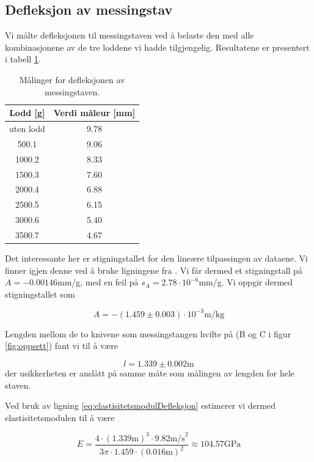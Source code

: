 \documentclass[a4paper,11pt, twocolumn]{article}
\begin{document}
\subsection{Defleksjon av messingstav}
Vi målte defleksjonen til messingstaven ved å belaste den med alle kombinasjonene av de tre loddene vi hadde tilgjengelig. Resultatene er presentert i tabell \ref{tab:defleksjon}.
\begin{table}[!ht]
\centering
\caption{Målinger for defleksjonen av messingstaven.}
\label{tab:defleksjon}
\begin{tabular}{cc}
	\toprule
	\toprule
	Lodd [g] & Verdi måleur [mm]\\
	\hline
	uten lodd & 9.78\\
	500.1 & 9.06\\
	1000.2 & 8.33\\
	1500.3 & 7.60\\
	2000.4 & 6.88\\
	2500.5 & 6.15\\
	3000.6 & 5.40\\
	3500.7 & 4.67\\
	\toprule
\end{tabular}
\end{table}

Det interessante her er stigningstallet for den lineære tilpassingen av dataene. Vi finner igjen denne ved å bruke ligningene fra \cite[s. 39]{squires}. Vi får dermed et stigningstall på $A = -0.00146$mm/g, med en feil på $s_A=2.78\cdot10^{-6}$mm/g. Vi oppgir dermed stigningstallet som

\begin{equation}
	A = -(1.459\pm0.003)\cdot10^{-3}\text{
m/kg}
\end{equation}

Lengden mellom de to knivene som messingstangen hvilte på (B og C i figur \ref{fig:oppsett}) fant vi til å være 

\begin{equation}
	l = 1.339\pm0.002\text{m}
\end{equation} 
der usikkerheten er anslått på samme måte som målingen av lengden for hele staven.

Ved bruk av ligning \eqref{eq:elastisitetsmodulDefleksjon} estimerer vi dermed elastisitetsmodulen til å være

\begin{equation}
	E = \frac{4\cdot(1.339\text{m})^3\cdot9.82\text{m/s}^2}{3\pi\cdot 1.459\cdot (0.016\text{m})^2} \approx 104.57\text{GPa}
\end{equation}
\end{document}
